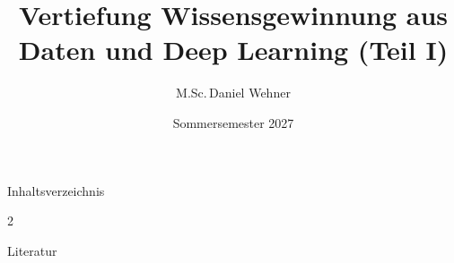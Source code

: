 \documentclass[aspectratio=169,10pt,serif,t]{beamer}
\title[Vertiefung Wissensgewinnung aus Daten und Deep Learning]{%
	Vertiefung Wissensgewinnung aus Daten und Deep Learning (Teil I)
}
\author{M.Sc.\,Daniel Wehner}
\institute[DHBW CAS Heilbronn]{DHBW Center of Advanced Studies (CAS) Heilbronn}
\date{Sommersemester 2027}
\begin{document}
\begin{frame}
  	\titlepage
\end{frame}

\begin{frame}{Inhaltsverzeichnis}
	\begin{multicols}{2}
  		\tableofcontents[sectionstyle=show/show,subsectionstyle=hide/hide/hide]
	\end{multicols}
\end{frame}















\begin{frame}[allowframebreaks]{Literatur}{}
	\printbibliography[heading=none]
\end{frame}
\end{document}
